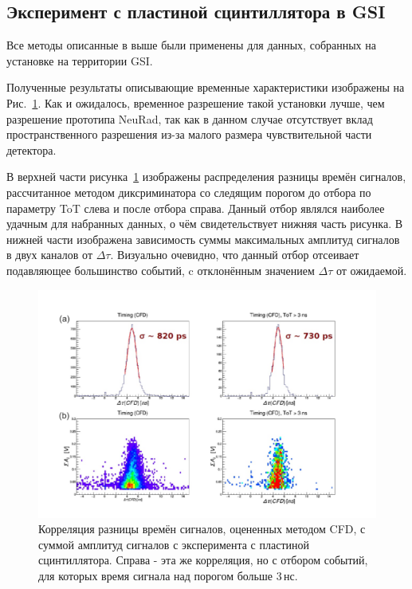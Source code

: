\subsection{Эксперимент с пластиной сцинтиллятора в GSI}

Все методы описанные в выше были применены для данных, собранных на установке на территории GSI.

Полученные результаты описывающие временные характеристики изображены на Рис.~\ref{ris:GSIcfd_amp}. Как и ожидалось, временное разрешение такой установки лучше, чем разрешение прототипа NeuRad, так как в данном случае отсутствует вклад пространственного разрешения из-за малого размера чувствительной части детектора.

В верхней части рисунка~\ref{ris:GSIcfd_amp} изображены распределения разницы времён сигналов, рассчитанное методом диксриминатора со следящим порогом до отбора по параметру ToT слева и после отбора справа. Данный отбор являлся наиболее удачным для набранных данных, о чём свидетельствует нижняя часть рисунка. В нижней части изображена зависимость суммы максимальных амплитуд сигналов в двух каналов от $\Delta\tau$. Визуально очевидно, что данный отбор отсеивает подавляющее большинство событий, c отклонённым значением $\Delta\tau$ от ожидаемой.

\begin{figure}
	\centering
	\includegraphics[width=1\linewidth]{CFD_amp.png}
	\caption{Корреляция разницы времён сигналов, оцененных методом CFD, с суммой амплитуд сигналов с эксперимента с пластиной сцинтиллятора. Справа - эта же корреляция, но с отбором событий, для которых время сигнала над порогом больше 3\,нс.}
	\label{ris:GSIcfd_amp}
\end{figure}